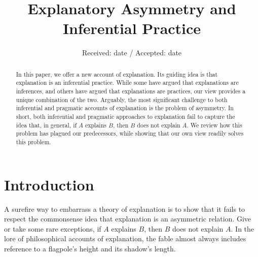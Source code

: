 \documentclass[natbib]{svjour3}                     %
\begin{document}
\sloppy
\title{Explanatory Asymmetry and Inferential Practice
}


\author{}


\institute{}

\date{Received: date / Accepted: date}

\raggedbottom

\maketitle

\begin{abstract}

In this paper, we offer a new account of explanation. Its guiding idea is that explanation is an inferential practice. While some have argued that explanations are inferences, and others have argued that explanations are practices, our view provides a unique combination of the two. Arguably, the most significant challenge to both inferential and pragmatic accounts of explanation is the problem of asymmetry. In short, both inferential and pragmatic approaches to explanation fail to capture the idea that, in general, if $A$ explains $B$, then $B$ does not explain $A$. We review how this problem has plagued our predecessors, while showing that our own view readily solves this problem.
\end{abstract}


\section{Introduction}
\label{sec:introduction}

A surefire way to embarrass a theory of explanation is to show that it fails to respect the commonsense idea that explanation is an asymmetric relation. Give or take some rare exceptions, if $A$ explains $B$, then $B$ does not explain $A$. In the lore of philosophical accounts of explanation, the fable almost always includes reference to a flagpole's height and its shadow's length. 
\end{document}
